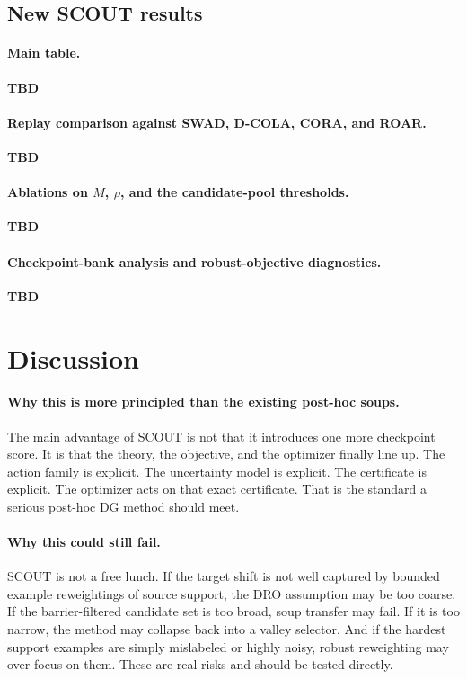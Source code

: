 \documentclass{article}
\newcommand{\TBD}{\textbf{TBD}}
\newcommand{\scout}{\textup{\textsc{SCOUT}}}
\newcommand{\swad}{\textup{\textsc{SWAD}}}
\newcommand{\dcola}{\textup{\textsc{D-COLA}}}
\newcommand{\cora}{\textup{\textsc{CORA}}}
\newcommand{\roar}{\textup{\textsc{ROAR}}}
\begin{document}
\subsection{New \scout{} results}

\paragraph{Main table.}
\TBD{}

\paragraph{Replay comparison against \swad{}, \dcola{}, \cora{}, and \roar{}.}
\TBD{}

\paragraph{Ablations on \(M\), \(\rho\), and the candidate-pool thresholds.}
\TBD{}

\paragraph{Checkpoint-bank analysis and robust-objective diagnostics.}
\TBD{}

\section{Discussion}

\paragraph{Why this is more principled than the existing post-hoc soups.}
The main advantage of \scout{} is not that it introduces one more checkpoint score. It is that the theory, the objective, and the optimizer finally line up. The action family is explicit. The uncertainty model is explicit. The certificate is explicit. The optimizer acts on that exact certificate. That is the standard a serious post-hoc DG method should meet.

\paragraph{Why this could still fail.}
\scout{} is not a free lunch. If the target shift is not well captured by bounded example reweightings of source support, the DRO assumption may be too coarse. If the barrier-filtered candidate set is too broad, soup transfer may fail. If it is too narrow, the method may collapse back into a valley selector. And if the hardest support examples are simply mislabeled or highly noisy, robust reweighting may over-focus on them. These are real risks and should be tested directly.
\end{document}
